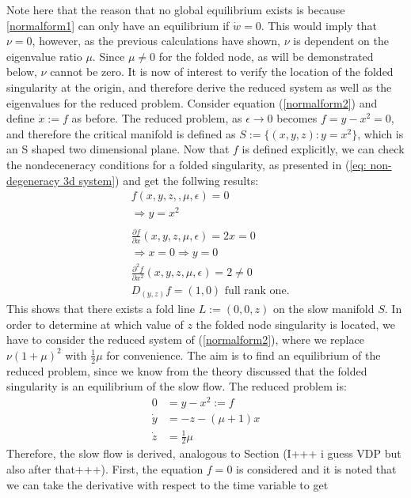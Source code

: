 Note here that the reason that no global equilibrium exists is because \ref{normalform1} can only have an equilibrium if $\dot{w} =0$. This would imply that $\nu=0$, however, as the previous calculations have shown, $\nu$ is dependent on the eigenvalue ratio $\mu$. Since $\mu \neq 0$ for the folded node, as will be demonstrated below, $\nu$ cannot be zero.
It is now of interest to verify the location of the folded singularity at the origin, and therefore derive the reduced system as well as the eigenvalues for the reduced problem.
Consider equation (\ref{normalform2}) and define $\dot{x}:=f$ as before. The reduced problem, as $\epsilon \to 0$ becomes $f= y-x^2 =0$, and therefore the critical manifold is defined as $S:= \{ (x,y,z) : y=x^2\}$, which is an S shaped two dimensional plane.
Now that $f$ is defined explicitly, we can check the nondeceneracy conditions for a folded singularity, as presented in (\ref{eq: non-degeneracy 3d system}) and get the follwing results:
\begin{align*}
&f(x,y,z,,\mu, \epsilon) = 0\\
&\Rightarrow y=x^2\\
\\
&\frac{\partial f}{\partial x} (x,y,z,\mu,\epsilon) = 2x = 0\\
&\Rightarrow x=0 \Rightarrow y=0 \\ 
&\frac{\partial^2 f}{\partial x^2}(x,y,z,\mu,\epsilon)  = 2 \neq 0\\
&D_{(y,z)}f= (1,0) \textrm{ full rank one}.
\end{align*}
This shows that there exists a fold line $L:=(0,0,z)$ on the slow manifold $S$.
In order to determine at which value of $z$ the folded node singularity is located, we have to consider the reduced system of (\ref{normalform2}), where we replace $\nu (1 + \mu)^2$ with $\frac{1}{2} \mu$ for convenience. The aim is to find an equilibrium of the reduced problem, since we know from the theory discussed that the folded singularity is an equilibrium of the slow flow.
The reduced problem is:
\begin{align}\label{normalform2red}
0 &= y - x^2 :=f\\
\dot{y} &=- z -(\mu +1)x \\
\dot{z} &=\frac{1}{2} \mu 
\end{align}
Therefore, the slow flow is derived, analogous to Section (I+++ i guess VDP but also after that+++). 
First, the equation $f=0$ is considered and it is noted that we can take the derivative with respect to the time variable to get 
